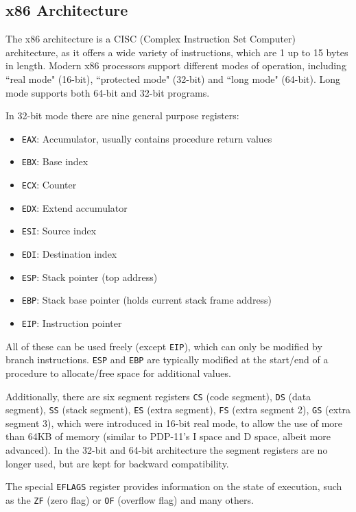 \documentclass{article}
\begin{document}
\subsection{x86 Architecture}
\label{x86arch}

The x86 architecture is a CISC (Complex Instruction Set Computer) architecture, as it offers a wide variety of instructions, which are 1 up to 15 bytes in length. Modern x86 processors support different modes of operation, including ``real mode" (16-bit), ``protected mode" (32-bit) and ``long mode" (64-bit). Long mode supports both 64-bit and 32-bit programs.

In 32-bit mode there are nine general purpose registers:

\begin{itemize}
    \item \texttt{EAX}: Accumulator, usually contains procedure return values
    \item \texttt{EBX}: Base index
    \item \texttt{ECX}: Counter
    \item \texttt{EDX}: Extend accumulator
    \item \texttt{ESI}: Source index
    \item \texttt{EDI}: Destination index
    \item \texttt{ESP}: Stack pointer (top address)
    \item \texttt{EBP}: Stack base pointer (holds current stack frame address)
    \item \texttt{EIP}: Instruction pointer
\end{itemize}

All of these can be used freely (except \texttt{EIP}), which can only be modified by branch instructions. \texttt{ESP} and \texttt{EBP} are typically modified at the start/end of a procedure to allocate/free space for additional values.

Additionally, there are six segment registers \texttt{CS} (code segment), \texttt{DS} (data segment), \texttt{SS} (stack segment), \texttt{ES} (extra segment), \texttt{FS} (extra segment 2), \texttt{GS} (extra segment 3), which were introduced in 16-bit real mode, to allow the use of more than 64KB of memory (similar to PDP-11's I space and D space, albeit more advanced). In the 32-bit and 64-bit architecture the segment registers are no longer used, but are kept for backward compatibility.

The special \texttt{EFLAGS} register provides information on the state of execution, such as the \texttt{ZF} (zero flag) or \texttt{OF} (overflow flag) and many others.
\end{document}
